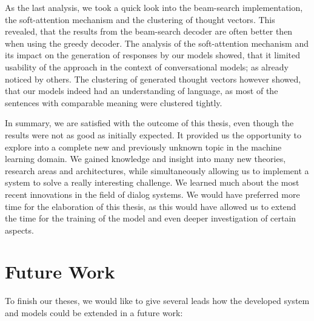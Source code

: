 As the last analysis, we took a quick look into the beam-search implementation, the soft-attention mechanism and the clustering of thought vectors. This revealed, that the results from the beam-search decoder are often better then when using the greedy decoder. The analysis of the soft-attention mechanism and its impact on the generation of responses by our models showed, that it limited usability of the approach in the context of conversational models; as already noticed by others. The clustering of generated thought vectors however showed, that our models indeed had an understanding of language, as most of the sentences with comparable meaning were clustered tightly.

In summary, we are satisfied with the outcome of this thesis, even though the results were not as good as initially expected. It provided us the opportunity to explore into a complete new and previously unknown topic in the machine learning domain. We gained knowledge and insight into many new theories, research areas and architectures, while simultaneously allowing us to implement a system to solve a really interesting challenge. We learned much about the most recent innovations in the field of dialog systems. We would have preferred more time for the elaboration of this thesis, as this would have allowed us to extend the time for the training of the model and even deeper investigation of certain aspects.

\chapter{Future Work}

To finish our theses, we would like to give several leads how the developed system and models could be extended in a future work:

